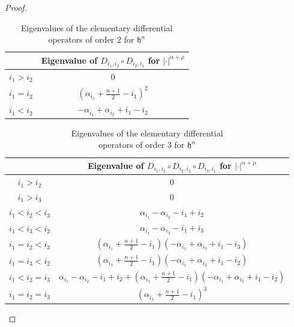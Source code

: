 \documentclass[12pt, reqno, oneside]{amsart}
\numberwithin{equation}{section}
\begin{document}
\begin{proof}
\begin{table}[ht]
    \centering
    \begin{tabular}{|c|c|}
        \hline
        & Eigenvalue of $D_{i_1,i_2} \circ D_{i_2,i_1}$ for $|\cdot|^{\alpha+\rho}$ \\
        \hline
        $i_1 > i_2$ & 0 \\
        $i_1 = i_2$ & $\left(\alpha_{i_1}+\frac{n+1}{2} - i_1\right)^2$ \\
        $i_1 < i_2$ & $-\alpha_{i_1}+\alpha_{i_2}+i_1-i_2$ \\
        \hline
    \end{tabular}
    \vspace{2mm}
    \caption{Eigenvalues of the elementary differential \\ operators of order $2$ for $\mathfrak{h}^n$}
    \label{table:elementary-differential-operators2}
\end{table}

\begin{table}[ht]
    \footnotesize
    \centering
    \begin{tabular}{|c|c|}
        \hline
        & Eigenvalue of $D_{i_1,i_2} \circ D_{i_2,i_3} \circ D_{i_3,i_1}$ for $|\cdot|^{\alpha+\rho}$ \\
        \hline
        $i_1 > i_2$ & 0 \\
        $i_1 > i_3$ & 0 \\
        $i_1 < i_2 < i_3$ & $\alpha_{i_1}-\alpha_{i_2}-i_1+i_2$ \\
        $i_1 < i_3 < i_2$ & $\alpha_{i_1}-\alpha_{i_3}-i_1+i_3$ \\
        $i_1 = i_2 < i_3$ & $\left(\alpha_{i_1}+\frac{n+1}{2}-i_1\right)\left(-\alpha_{i_1}+\alpha_{i_3}+i_1-i_3\right)$ \\
        $i_1 = i_3 < i_2$ & $\left(\alpha_{i_1}+\frac{n+1}{2}-i_1\right)\left(-\alpha_{i_1}+\alpha_{i_2}+i_1-i_2\right)$ \\
        $i_1 < i_2 = i_3$ & $\alpha_{i_1}-\alpha_{i_2}-i_1+i_2+\left(\alpha_{i_1}+\frac{n+1}{2}-i_1\right)\left(-\alpha_{i_1}+\alpha_{i_2}+i_1-i_2\right)$ \\
        $i_1 = i_2 = i_3$ & $\left(\alpha_{i_1}+\frac{n+1}{2}-i_1\right)^3$ \\
        \hline
    \end{tabular}
    \vspace{2mm}
    \caption{Eigenvalues of the elementary differential \\ operators of order $3$ for $\mathfrak{h}^n$}
    \label{table:elementary-differential-operators3}
\end{table}


\end{proof}
\end{document}
